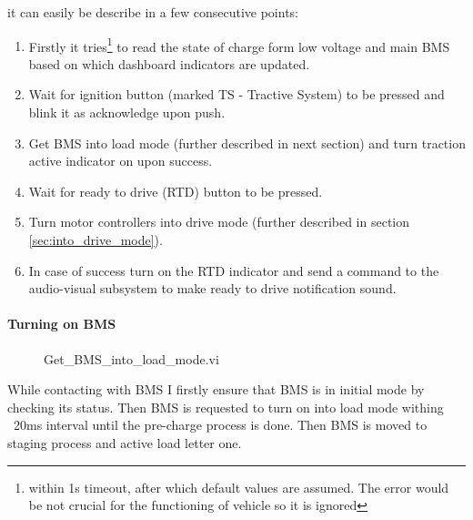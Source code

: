 it can easily be describe in a few consecutive points:
\begin{enumerate}
    \itemsep0.1em 
    \item Firstly it tries\footnote{within 1s timeout, after which default values are assumed. The error would be not crucial for the functioning of vehicle so it is ignored} to read the state of charge form low voltage and main BMS based on which dashboard indicators are updated.
    \item Wait for ignition button (marked TS - Tractive System) to be pressed and blink it as acknowledge upon push.
    \item Get BMS into load mode (further described in next section) and turn traction active indicator on upon success.
    \item Wait for ready to drive (RTD) button to be pressed.
    \item Turn motor controllers into drive mode (further described in section \ref{sec:into_drive_mode}).
    \item In case of success turn on the RTD indicator and send a command to the audio-visual subsystem to make ready to drive notification sound.
\end{enumerate}

\paragraph{Turning on BMS}
\begin{figure}[H]
    \centering
    \renewcommand{\thesubfigure}{}%
    \tightsubcaptions %
    \setlength{\subfloatlabelskip}{0pt}%
\end{figure}
\begin{figure}[H]\ContinuedFloat
    \centering
    \renewcommand{\thesubfigure}{}%
    \tightsubcaptions %
    \setlength{\subfloatlabelskip}{0pt}%
    \caption{Get\_BMS\_into\_load\_mode.vi}
    \label{vi:boot_BMS}
\end{figure}
While contacting with BMS I firstly ensure that BMS is in initial mode by checking its status. Then BMS is requested to turn on into load mode withing ~20ms interval until the pre-charge process is done. Then BMS is moved to staging process and active load letter one.

